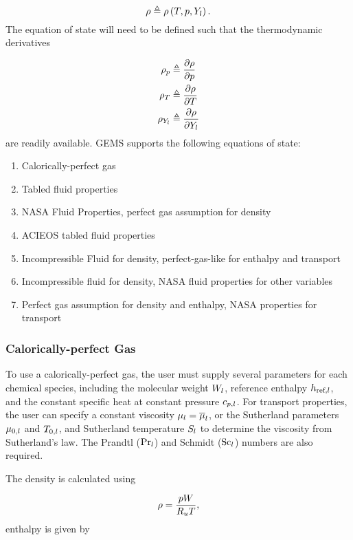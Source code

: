 \begin{equation}
	\rho \triangleq \rho \left( T, p, Y_{l} \right).
\end{equation}
The equation of state will need to be defined such that the thermodynamic derivatives

\begin{align}
	\rho_{p} &\triangleq \frac{\partial \rho}{\partial p} \\
	\rho_{T} &\triangleq \frac{\partial \rho}{\partial T} \\
	\rho_{Y_{l}} &\triangleq \frac{\partial \rho}{\partial Y_{l}} \\
\end{align}
are readily available. GEMS supports the following equations of state:

\begin{enumerate}
	\item Calorically-perfect gas
	\item Tabled fluid properties
	\item NASA Fluid Properties, perfect gas assumption for density
	\item ACIEOS tabled fluid properties
	\item Incompressible Fluid for density, perfect-gas-like for enthalpy and transport
	\item Incompressible fluid for density, NASA fluid properties for other variables
	\item Perfect gas assumption for density and enthalpy, NASA properties for transport
\end{enumerate}

\subsubsection{Calorically-perfect Gas}\label{sec:cpg}

To use a calorically-perfect gas, the user must supply several parameters for each chemical species, including the molecular weight $W_{l}$, reference enthalpy $h_{\text{ref,\ensuremath{l}}}$, and the constant specific heat at constant pressure $c_{p,l}$. For transport properties, the user can specify a constant viscosity $\mu_{l} = \overline{\mu}_{l}$, or the Sutherland parameters $\mu_{0,l}$ and $T_{0,l}$, and Sutherland temperature $S_{l}$ to determine the viscosity
from Sutherland's law. The Prandtl ($\text{Pr}_{l}$) and Schmidt ($\text{Sc}_{l}$) numbers are also required.

The density is calculated using

\begin{equation}
	\rho = \frac{p W}{R_u T},
\end{equation}
enthalpy is given by

